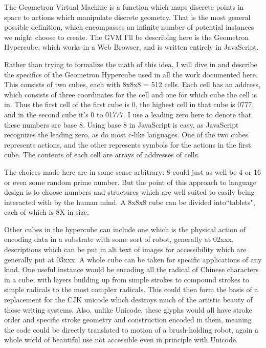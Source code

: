 \documentclass[11pt]{article}
\begin{document}
    The Geometron Virtual Machine is a function which maps discrete points in space to actions which manipulate discrete geometry.  That is the most general possible definition, which encompasses an infinite number of potential instances we might choose to create.  The GVM I'll be describing here is the Geometron Hypercube, which works in a Web Browser, and is written entirely in JavaScript.   


    Rather than trying to formalize the math of this idea, I will dive in and describe the specifics of the Geometron Hypercube used in all the work documented here.  This consists of two cubes, each with 8x8x8 = 512 cells.  Each cell has an address, which consists of three coordinates for the cell and one for which cube the cell is in.  Thus the first cell of the first cube is 0, the highest cell in that cube is 0777, and in the second cube it's 0 to 01777.  I use a leading zero here to denote that these numbers are base 8.  Using base 8 in JavaScript is easy, as JavaScript recognizes the leading zero, as do most c-like languages.   One of the two cubes represents actions, and the other represents symbols for the actions in the first cube.  The contents of each cell are arrays of addresses of cells.  

    The choices made here are in some sense arbitrary: 8 could just as well be 4 or 16 or even some random prime number.  But the point of this approach to language design is to choose numbers and structures which are well suited to easily being interacted with by the human mind.  A 8x8x8 cube can be divided into``tablets", each of which is 8X in size.  

    Other cubes in the hypercube can include one which is the physical action of encoding data in a substrate with some sort of robot, generally at 02xxx, descriptions which can be put in alt text of images for accessibility which are generally put at 03xxx.  A whole cube can be taken for specific applications of any kind.  One useful instance would be encoding all the radical of Chinese characters in a cube, with layers building up from simple strokes to compound strokes to simple radicals to the most complex radicals.  This could then form the basis of a replacement for the CJK unicode which destroys much of the artistic beauty of those writing systems.  Also, unlike Unicode, these glyphs would all have stroke order and specific stroke geometry and construction encoded in them, meaning the code could be directly translated to motion of a brush-holding robot, again a whole world of beautiful use not accessible even in principle with Unicode.
\end{document}
